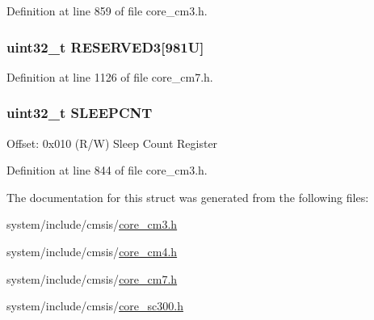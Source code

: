 Definition at line 859 of file core\+\_\+cm3.\+h.

\subsubsection[{\texorpdfstring{R\+E\+S\+E\+R\+V\+E\+D3}{RESERVED3}}]{\setlength{\rightskip}{0pt plus 5cm}uint32\+\_\+t R\+E\+S\+E\+R\+V\+E\+D3\mbox{[}981\+U\mbox{]}}\hypertarget{struct_d_w_t___type_a50825e7e6f5677bb8276fb8cf3191f7f}{}\label{struct_d_w_t___type_a50825e7e6f5677bb8276fb8cf3191f7f}


Definition at line 1126 of file core\+\_\+cm7.\+h.

\subsubsection[{\texorpdfstring{S\+L\+E\+E\+P\+C\+NT}{SLEEPCNT}}]{ uint32\+\_\+t S\+L\+E\+E\+P\+C\+NT}\hypertarget{struct_d_w_t___type_aafa1400cd3168b21652b86599ad3ed83}{}\label{struct_d_w_t___type_aafa1400cd3168b21652b86599ad3ed83}
Offset\+: 0x010 (R/W) Sleep Count Register 

Definition at line 844 of file core\+\_\+cm3.\+h.



The documentation for this struct was generated from the following files\+:\begin{DoxyCompactItemize}
\item 
system/include/cmsis/\hyperlink{core__cm3_8h}{core\+\_\+cm3.\+h}\item 
system/include/cmsis/\hyperlink{core__cm4_8h}{core\+\_\+cm4.\+h}\item 
system/include/cmsis/\hyperlink{core__cm7_8h}{core\+\_\+cm7.\+h}\item 
system/include/cmsis/\hyperlink{core__sc300_8h}{core\+\_\+sc300.\+h}\end{DoxyCompactItemize}
